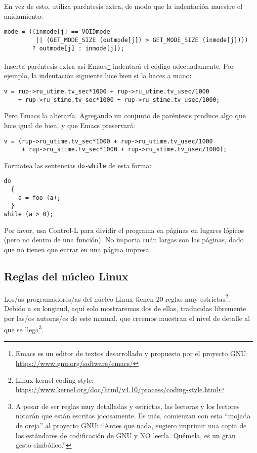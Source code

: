 En vez de esto, utiliza paréntesis extra, de modo que la indentación muestre el anidamiento:

\begin{verbatim}
mode = ((inmode[j] == VOIDmode
         || (GET_MODE_SIZE (outmode[j]) > GET_MODE_SIZE (inmode[j])))
        ? outmode[j] : inmode[j]);
\end{verbatim}

Inserta paréntesis extra así Emacs\footnote{Emacs es un editor de textos desarrollado y propuesto por el proyecto GNU: \url{https://www.gnu.org/software/emacs/}} indentará el código adecuadamente. Por ejemplo, la indentación siguiente luce bien si la haces a mano:

\begin{verbatim}
v = rup->ru_utime.tv_sec*1000 + rup->ru_utime.tv_usec/1000
    + rup->ru_stime.tv_sec*1000 + rup->ru_stime.tv_usec/1000;
\end{verbatim}

Pero Emacs la alteraría. Agregando un conjunto de paréntesis produce algo que luce igual de bien, y que Emacs preservará:

\begin{verbatim}
v = (rup->ru_utime.tv_sec*1000 + rup->ru_utime.tv_usec/1000
     + rup->ru_stime.tv_sec*1000 + rup->ru_stime.tv_usec/1000);
\end{verbatim}

Formatea las sentencias \texttt{do-while} de esta forma:

\begin{verbatim}
do
  {
    a = foo (a);
  }
while (a > 0);
\end{verbatim}

Por favor, usa Control-L para dividir el programa en páginas en lugares lógicos (pero no dentro de una función). No importa cuán largas son las páginas, dado que no tienen que entrar en una página impresa.
 

\subsection{Reglas del núcleo Linux}

Los/as programadores/as del núcleo Linux tienen 20 reglas muy estrictas\footnote{Linux kernel coding style: \url{https://www.kernel.org/doc/html/v4.10/process/coding-style.html}}. Debido a su longitud, aquí solo mostraremos dos de ellas, traducidas libremente por las/os autoras/es de este manual, que creemos muestran el nivel de detalle al que se llega\footnote{A pesar de ser reglas muy detalladas y estrictas, las lectoras y los lectores notarán que están escritas jocosamente. Es más, comienzan con esta ``mojada de oreja'' al proyecto GNU: ``Antes que nada, sugiero imprimir una copia de los estándares de codificación de GNU y NO leerla. Quémela, es un gran gesto simbólico.''}.

